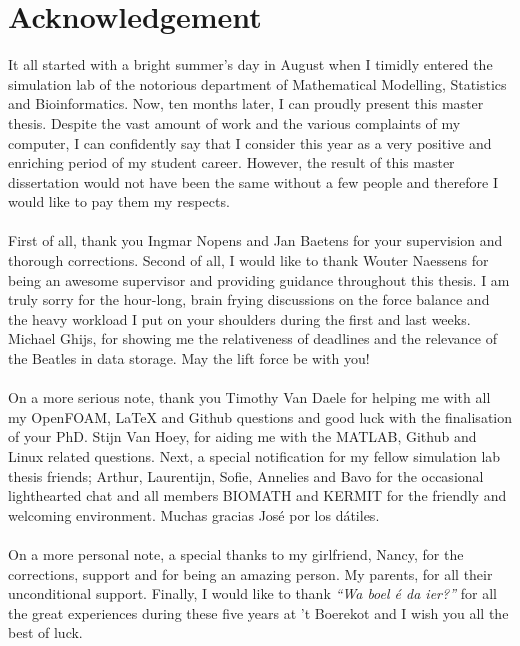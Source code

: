 \chapter{Acknowledgement}
It all started with a bright summer's day in August when I timidly entered the simulation lab of the notorious department of Mathematical Modelling, Statistics and Bioinformatics. Now, ten months later, I can proudly present this master thesis. Despite the vast amount of work and the various complaints of my computer, I can confidently say that I consider this year as a very positive and enriching period of my student career. However, the result of this master dissertation would not have been the same without a few people and therefore I would like to pay them my respects. \\ \\
First of all, thank you Ingmar Nopens and Jan Baetens for your supervision and thorough corrections. Second of all, I would like to thank Wouter Naessens for being an awesome supervisor and providing guidance throughout this thesis. I am truly sorry for the hour-long, brain frying discussions on the force balance and the heavy workload I put on your shoulders during the first and last weeks. Michael Ghijs, for showing me the relativeness of deadlines and the relevance of the Beatles in data storage. May the lift force be with you! \\ \\
On a more serious note, thank you Timothy Van Daele for helping me with all my OpenFOAM, LaTeX and Github questions and good luck with the finalisation of your PhD. Stijn Van Hoey, for aiding me with the MATLAB, Github and Linux related questions. Next, a special notification for my fellow simulation lab thesis friends; Arthur, Laurentijn, Sofie, Annelies and Bavo for the occasional lighthearted chat and all members BIOMATH and KERMIT for the friendly and welcoming 
environment. Muchas gracias Jos\'e por los d\'atiles. \\ \\
On a more personal note, a special thanks to my girlfriend, Nancy, for the corrections, support and for being an amazing person. My parents, for all their unconditional support. Finally, I would like to thank \emph{``Wa boel \'e da ier?''} for all the great experiences during these five years at 't Boerekot and I wish you all the best of luck.

